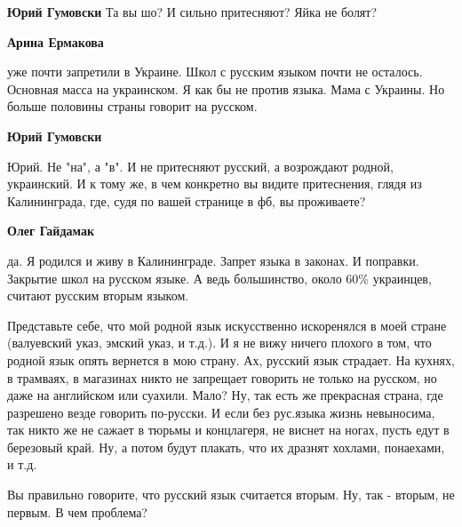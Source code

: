 \begin{itemize}
\begin{itemize}

\textbf{Юрий Гумовски} Та вы шо? И сильно притесняют? Яйка не болят?


\textbf{Арина Ермакова} 

уже почти запретили в Украине. Школ с русским языком почти не осталось.
Основная масса на украинском. Я как бы не против языка. Мама с Украины. Но
больше половины страны говорит на русском.


\textbf{Юрий Гумовски} 

Юрий. Не "на", а "в". И не притесняют русский, а возрождают родной, украинский.
И к тому же, в чем конкретно вы видите притеснения, глядя из Калининграда, где,
судя по вашей странице в фб, вы проживаете?


\textbf{Олег Гайдамак} 

да. Я родился и живу в Калининграде. Запрет языка в
законах. И поправки. Закрытие школ на русском языке. А ведь большинство, около
60\% украинцев, считают русским вторым языком.



Представьте себе, что мой родной язык искусственно искоренялся в моей стране
(валуевский указ, эмский указ, и т.д.). И я не вижу ничего плохого в том, что
родной язык опять вернется в мою страну. Ах, русский язык страдает. На кухнях,
в трамваях, в магазинах никто не запрещает говорить не только на русском, но
даже на английском или суахили. Мало? Ну, так есть же прекрасная страна, где
разрешено везде говорить по-русски. И если без рус.языка жизнь невыносима, так
никто же не сажает в тюрьмы и концлагеря, не виснет на ногах, пусть едут в
березовый край. Ну, а потом будут плакать, что их дразнят хохлами, понаехами, и
т.д.

Вы правильно говорите, что русский язык считается вторым. Ну, так - вторым, не
первым. В чем проблема?



\end{itemize}
\end{itemize}
